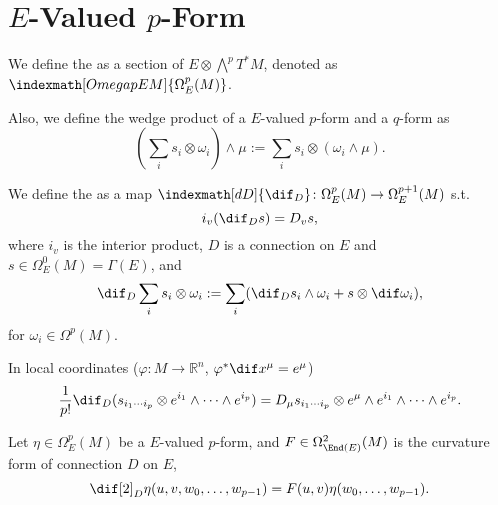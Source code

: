 \documentclass[openany, oneside, a5paper]{book}
\begin{document}
\section{\texorpdfstring{$E$-Valued $p$-Form}{E-Valued p-Form}}

\begin{definition}
    We define the  as a section of $E \otimes \bigwedge\nolimits^p T^*M$, denoted as $\indexmath[Omega p E M]{\Omega^p_E(M)}$.
\end{definition}

Also, we define the wedge product of a $E$-valued $p$-form and a $q$-form as
\begin{equation}
    \left(
        \sum_i s_i \otimes \omega_i 
    \right) \wedge \mu := \sum_i s_i \otimes (\omega_i \wedge \mu). 
\end{equation}

\begin{definition}
    We define the  as a map
    $\indexmath[dD]{\dif_D} \colon \Omega_E^p(M) \to \Omega_E^{p+1}(M)$ s.t.
    \begin{equation}
        i_v (\dif_D s) = D_v s,
    \end{equation}
    where $i_v$ is the interior product, $D$ is a connection on $E$ and $s \in \Omega^0_E(M) = \Gamma(E)$, and
    \begin{equation}
        \dif_D \sum_i s_i \otimes \omega_i := 
        \sum_i (
            \dif_D s_i \wedge \omega_i
            + s \otimes \dif \omega_i
        ),
    \end{equation}
    for $\omega_i \in \Omega^p(M)$.
\end{definition}

In local coordinates ($\varphi \colon M \to \mathbb R^n$, $\varphi^* \dif x^\mu = e^\mu$)
\begin{equation}
    \frac 1 {p!} \dif_D (s_{i_1 \cdots i_p} \otimes e^{i_1} \wedge \cdots \wedge e^{i_p})
    = D_\mu s_{i_1 \cdots i_p} \otimes e^\mu \wedge e^{i_1} \wedge \cdots \wedge e^{i_p}.
\end{equation}

\begin{theorem}
    Let $\eta \in \Omega^p_E(M)$ be a $E$-valued $p$-form, and $F \in \Omega^2_{\End(E)}(M)$ is the curvature form of connection $D$ on $E$,
    \begin{equation}
        \dif[2]_D \eta (u, v, w_0, \ldots, w_{p-1}) = F(u, v) \eta(w_0, \ldots, w_{p-1}).
    \end{equation}
\end{theorem}
\end{document}
